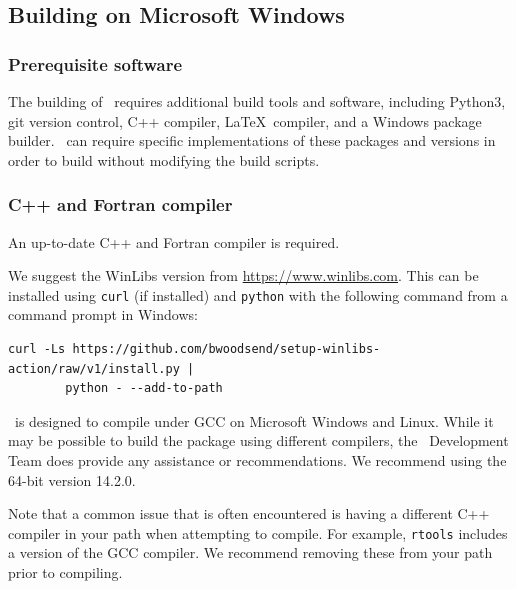 

  
\subsection{Building on Microsoft Windows}

\subsubsection{Prerequisite software}

The building of \CNAME\ requires additional build tools and software, including Python3, git version control, C++ compiler, \LaTeX\ compiler, and a Windows package builder. \CNAME\ can require specific implementations of these packages and versions in order to build without modifying the build scripts.

\subsubsection*{C++ and Fortran compiler}

An up-to-date C++ and Fortran compiler is required. 

We suggest the WinLibs version from \url{https://www.winlibs.com}. This can be installed using \texttt{curl} (if installed) and \texttt{python} with the following command from a command prompt in Windows:
\begin{small}
\begin{verbatim}
curl -Ls https://github.com/bwoodsend/setup-winlibs-action/raw/v1/install.py |
        python - --add-to-path
\end{verbatim}
\end{small}

\CNAME\ is designed to compile under GCC on Microsoft Windows and Linux. While it may be possible to build the package using different compilers, the \CNAME\ Development Team does provide any assistance or recommendations. We recommend using the 64-bit version 14.2.0.

Note that a common issue that is often encountered is having a different C++ compiler in your path when attempting to compile. For example, \texttt{rtools} includes a version of the GCC compiler. We recommend removing these from your path prior to compiling.

